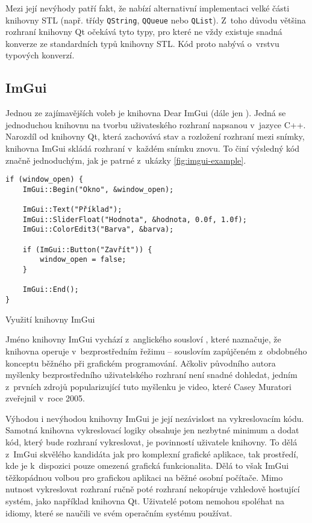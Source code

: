 
Mezi její nevýhody patří fakt, že nabízí alternativní implementaci velké části knihovny STL (např. třídy \texttt{QString}, \texttt{QQueue} nebo \texttt{QList}). Z~toho důvodu většina rozhraní knihovny Qt očekává tyto typy, pro které ne vždy existuje snadná konverze ze standardních typů knihovny STL. Kód proto nabývá o~vrstvu typových konverzí.

\subsection{ImGui}

Jednou ze zajímavějších voleb je knihovna Dear ImGui\cite{github-imgui} (dále jen ). Jedná se jednoduchou knihovnu na tvorbu uživateského rozhraní napsanou v~jazyce C++. Narozdíl od knihovny Qt, která zachovává stav a rozložení rozhraní mezi snímky, knihovna ImGui skládá rozhraní v~každém snímku znovu. To činí výsledný kód značně jednoduchým, jak je patrné z~ukázky \ref{fig:imgui-example}.

\begin{listing}
\begin{verbatim}
if (window_open) {
    ImGui::Begin("Okno", &window_open);

    ImGui::Text("Příklad");
    ImGui::SliderFloat("Hodnota", &hodnota, 0.0f, 1.0f);
    ImGui::ColorEdit3("Barva", &barva);
    
    if (ImGui::Button("Zavřít")) {
        window_open = false;
    }

    ImGui::End();
}
\end{verbatim}
\caption{Využití knihovny ImGui}
\label{fig:imgui-example}
\end{listing}

Jméno knihovny ImGui vychází z~anglického sousloví , které naznačuje, že knihovna operuje v~bezprostředním řežimu -- souslovím zapůjčeném z~obdobného konceptu běžného při grafickém programování. Ačkoliv původního autora myšlenky bezprostředního uživatelského rozhraní není snadné dohledat, jedním z~prvních zdrojů popularizující tuto myšlenku je video, které Casey Muratori zveřejnil v~roce 2005\cite{casey-imgui}.


Výhodou i nevýhodou knihovny ImGui je její nezávislost na vykreslovacím kódu. Samotná knihovna vykreslovací logiky obsahuje jen nezbytné minimum a dodat kód, který bude rozhraní vykreslovat, je povinností uživatele knihovny. To dělá z~ImGui skvělého kandidáta jak pro komplexní grafické aplikace, tak prostředí, kde je k~dispozici pouze omezená grafická funkcionalita. Dělá to však ImGui těžkopádnou volbou pro grafickou aplikaci na běžné osobní počítače. Mimo nutnost vykreslovat rozhraní ručně poté rozhraní nekopíruje vzhledově hostující systém, jako například knihovna Qt. Uživatelé potom nemohou spoléhat na idiomy, které se naučili ve svém operačním systému používat.

